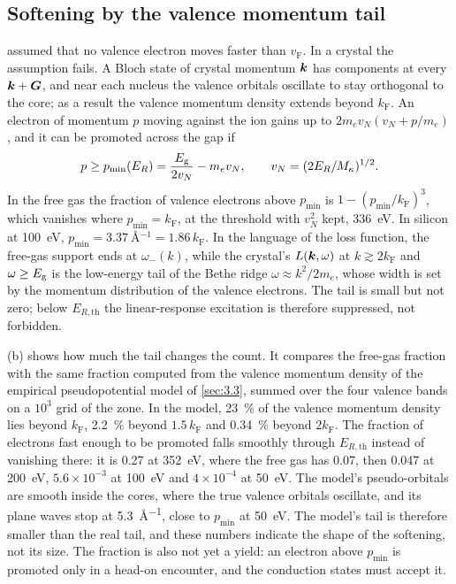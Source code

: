 \subsection{Softening by the valence momentum tail}\label{sec:19.2-soft}

 assumed that no valence electron moves faster than $v_{\mathrm{F}}$. In a crystal the assumption fails. A Bloch state of crystal momentum $\bm{k}$ has components at every $\bm{k} + \bm{G}$, and near each nucleus the valence orbitals oscillate to stay orthogonal to the core; as a result the valence momentum density extends beyond $k_{\mathrm{F}}$. An electron of momentum $p$ moving against the ion gains up to $2m_ev_N(v_N + p/m_e)$, and it can be promoted across the gap if
\begin{equation}
  p \ge p_{\mathrm{min}}(E_R) = \frac{E_{\mathrm{g}}}{2v_N} - m_ev_N , \qquad v_N = (2E_R/M_\kappa)^{1/2} .
  \label{eq:19.2-pmin}
\end{equation}
In the free gas the fraction of valence electrons above $p_{\mathrm{min}}$ is $1 - (p_{\mathrm{min}}/k_{\mathrm{F}})^3$, which vanishes where $p_{\mathrm{min}} = k_{\mathrm{F}}$, at the threshold with $v_N^2$ kept, \SI{336}{eV}. In silicon at \SI{100}{eV}, $p_{\mathrm{min}} = \SI{3.37}{\angstrom^{-1}} = 1.86\,k_{\mathrm{F}}$. In the language of the loss function, the free-gas support ends at $\omega_-(k)$, while the crystal's $L(\bm{k},\omega)$ at $k \gtrsim 2k_{\mathrm{F}}$ and $\omega \ge E_{\mathrm{g}}$ is the low-energy tail of the Bethe ridge $\omega \approx k^2/2m_e$, whose width is set by the momentum distribution of the valence electrons. The tail is small but not zero; below $E_{R,\mathrm{th}}$ the linear-response excitation is therefore suppressed, not forbidden.

(b) shows how much the tail changes the count. It compares the free-gas fraction with the same fraction computed from the valence momentum density of the empirical pseudopotential model of \cref{sec:3.3}, summed over the four valence bands on a $10^3$ grid of the zone. In the model, \SI{23}{\percent} of the valence momentum density lies beyond $k_{\mathrm{F}}$, \SI{2.2}{\percent} beyond $1.5\,k_{\mathrm{F}}$ and \SI{0.34}{\percent} beyond $2k_{\mathrm{F}}$. The fraction of electrons fast enough to be promoted falls smoothly through $E_{R,\mathrm{th}}$ instead of vanishing there: it is 0.27 at \SI{352}{eV}, where the free gas has 0.07, then 0.047 at \SI{200}{eV}, $5.6\times10^{-3}$ at \SI{100}{eV} and $4\times10^{-4}$ at \SI{50}{eV}. The model's pseudo-orbitals are smooth inside the cores, where the true valence orbitals oscillate, and its plane waves stop at \SI{5.3}{\angstrom^{-1}}, close to $p_{\mathrm{min}}$ at \SI{50}{eV}. The model's tail is therefore smaller than the real tail, and these numbers indicate the shape of the softening, not its size. The fraction is also not yet a yield: an electron above $p_{\mathrm{min}}$ is promoted only in a head-on encounter, and the conduction states must accept it.

